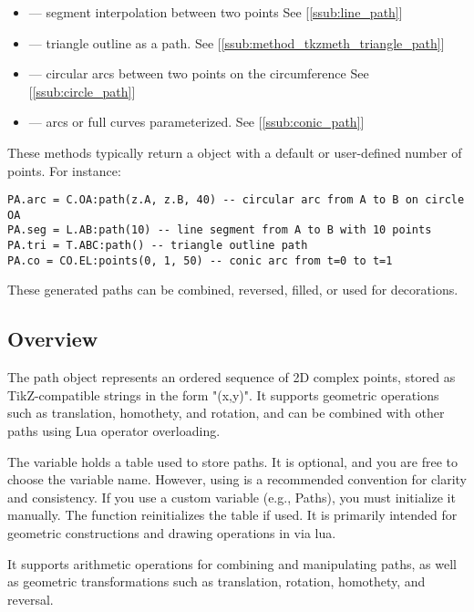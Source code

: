 \begin{itemize}
\item {} — segment interpolation between two points See [\ref{ssub:line_path}]
\item {} — triangle outline as a path. See [\ref{ssub:method_tkzmeth_triangle_path}]
\item {} — circular arcs between two points on the circumference See [\ref{ssub:circle_path}]
\item {} — arcs or full curves parameterized. See [\ref{ssub:conic_path}]
\end{itemize}

These methods typically return a  object with a default or user-defined number of points. For instance:

\begin{verbatim}
PA.arc = C.OA:path(z.A, z.B, 40) -- circular arc from A to B on circle OA
PA.seg = L.AB:path(10) -- line segment from A to B with 10 points
PA.tri = T.ABC:path() -- triangle outline path
PA.co = CO.EL:points(0, 1, 50) -- conic arc from t=0 to t=1
\end{verbatim}

These generated paths can be combined, reversed, filled, or used for \TIKZ{} decorations.


\subsection{Overview}

The path object represents an ordered sequence of 2D complex points, stored as TikZ-compatible strings in the form "(x,y)". It supports geometric operations such as translation, homothety, and rotation, and can be combined with other paths using Lua operator overloading.

The variable  holds a table used to store paths. It is optional, and you are free to choose the variable name. However, using  is a recommended convention for clarity and consistency. If you use a custom variable (e.g., Paths), you must initialize it manually. The  function reinitializes the  table if used.
 It is primarily intended for geometric constructions and drawing operations in \TIKZ{} via lua\LATEX{}.

It supports arithmetic operations for combining and manipulating paths, as well as geometric transformations such as translation, rotation, homothety, and reversal.

